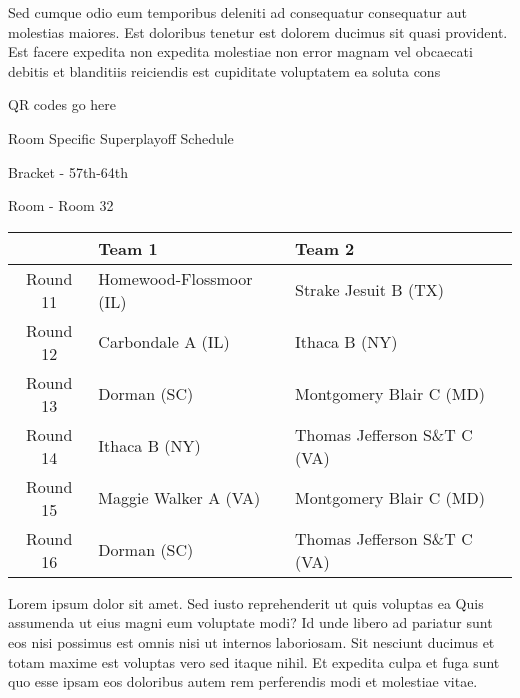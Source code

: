 \documentclass{article}%
\begin{document}
\newline%
    Sed cumque odio eum temporibus deleniti ad consequatur consequatur aut molestias maiores. Est doloribus tenetur est dolorem ducimus sit quasi provident. Est facere expedita non expedita molestiae non error magnam vel obcaecati debitis et blanditiis reiciendis est cupiditate voluptatem ea soluta cons%
\vspace*{140pt}%
\begin{center}%
\begin{Huge}%
QR codes go here%
\end{Huge}%
\end{center}%
\newpage%
\begin{center}%
\begin{Huge}%
Room Specific Superplayoff Schedule%
\end{Huge}%
\vspace*{8pt}%
\linebreak%
\begin{Large}%
Bracket {-} 57th{-}64th%
\end{Large}%
\vspace*{8pt}%
\linebreak%
\vspace*{8pt}%
\begin{Large}%
Room {-} Room 32%
\end{Large}%
\end{center}%
%
\begin{tabularx}{\textwidth}{|c|Y|Y|}%
\hline%
&Team 1&Team 2\\%
\hline%
Round 11&Homewood{-}Flossmoor (IL)&Strake Jesuit B (TX)\\%
Round 12&Carbondale A (IL)&Ithaca B (NY)\\%
Round 13&Dorman (SC)&Montgomery Blair C (MD)\\%
Round 14&Ithaca B (NY)&Thomas Jefferson S\&T C (VA)\\%
Round 15&Maggie Walker A (VA)&Montgomery Blair C (MD)\\%
Round 16&Dorman (SC)&Thomas Jefferson S\&T C (VA)\\%
\hline%
\end{tabularx}%
\vspace*{8pt}%
\newline%
    Lorem ipsum dolor sit amet. Sed iusto reprehenderit ut quis voluptas ea Quis assumenda ut eius magni eum voluptate modi? Id unde libero ad pariatur sunt eos nisi possimus est omnis nisi ut internos laboriosam. Sit nesciunt ducimus et totam maxime est voluptas vero sed itaque nihil. Et expedita culpa et fuga sunt quo esse ipsam eos doloribus autem rem perferendis modi et molestiae vitae.\newline%
\end{document}
